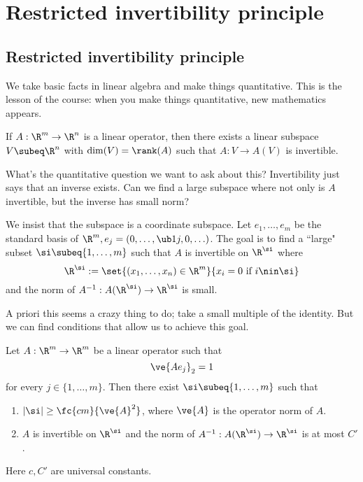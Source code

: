 
\chapter{Restricted invertibility principle}
\section{Restricted invertibility principle}
We take basic facts in linear algebra and make things quantitative. This is the lesson of the course: when you make things quantitative, new mathematics appears.

\begin{pr}
If $A:\R^m\to \R^n$ is a linear operator, then there exists a linear subspace $V\subeq \R^n$ with $\dim(V)=\rank(A)$ such that $A:V\to A(V)$ is invertible. 
\end{pr}

What's the quantitative question we want to ask about this? Invertibility just says that an inverse exists. Can we find a large subspace where not only is $A$ invertible, but the inverse has small norm?

We insist that the subspace is a coordinate subspace.  Let $e_1,\ldots, e_m$ be the standard basis of $\R^m, e_j=(0,\ldots, \ub1j,0,\ldots)$. 
The goal is to find a ``large" subset $\si\subeq \{1,\ldots, m\}$ such that  $A$ is invertible on $\R^\si$ where 
\[
\R^{\si}:=\set{(x_1,\ldots, x_n)\in \R^m}{x_i=0\text{ if }i\nin \si}
\]
and the norm of $A^{-1}:A(\R^\si)\to \R^{\si}$ is small.

A priori this seems a crazy thing to do; take a small multiple of the identity. But we can find conditions that allow us to achieve this goal.

\begin{thm}
Let $A:\R^m\to \R^m$ be a linear operator such that 
\[
\ve{Ae_j}_2=1
\]
for every $j\in \{1,\ldots, m\}$. Then there exist $\si\subeq \{1,\ldots, m\}$ such that
\begin{enumerate}
\item
$|\si|\ge \fc{cm}{\ve{A}^2}$, where $\ve{A}$ is the operator norm of $A$.
\item
$A$ is invertible on $\R^{\si}$ and the norm of $A^{-1}:A(\R^{\si})\to \R^{\si}$ is at most $C'$.
\end{enumerate}
Here $c,C'$ are universal constants.
\end{thm}


